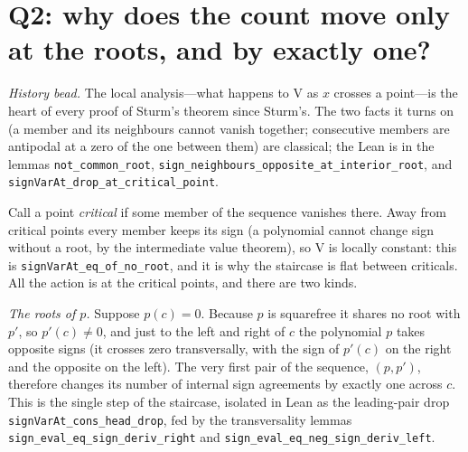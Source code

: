 \documentclass[11pt]{article}
\newcommand{\lean}[1]{\texttt{#1}}
\newcommand{\V}{\mathrm{V}}
\begin{document}
\section{Q2: why does the count move only at the roots, and by exactly one?}\label{sec:q2}

\emph{History bead.} The local analysis---what happens to $\V$ as $x$ crosses a point---is the
heart of every proof of Sturm's theorem since Sturm's. The two facts it turns on (a member and
its neighbours cannot vanish together; consecutive members are antipodal at a zero of the one
between them) are classical; the Lean is in the lemmas \lean{not\_common\_root},
\lean{sign\_neighbours\_opposite\_at\_interior\_root}, and
\lean{signVarAt\_drop\_at\_critical\_point}.

Call a point \emph{critical} if some member of the sequence vanishes there. Away from critical
points every member keeps its sign (a polynomial cannot change sign without a root, by the
intermediate value theorem), so $\V$ is locally constant: this is \lean{signVarAt\_eq\_of\_no\_root},
and it is why the staircase is flat between criticals. All the action is at the critical points,
and there are two kinds.

\emph{The roots of $p$.} Suppose $p(c)=0$. Because $p$ is squarefree it shares no root with $p'$,
so $p'(c)\ne0$, and just to the left and right of $c$ the polynomial $p$ takes opposite signs
(it crosses zero transversally, with the sign of $p'(c)$ on the right and the opposite on the
left). The very first pair of the sequence, $(p,p')$, therefore changes its number of internal
sign agreements by exactly one across $c$. This is the single step of the staircase, isolated in
Lean as the leading-pair drop \lean{signVarAt\_cons\_head\_drop}, fed by the transversality lemmas
\lean{sign\_eval\_eq\_sign\_deriv\_right} and \lean{sign\_eval\_eq\_neg\_sign\_deriv\_left}.
\end{document}
